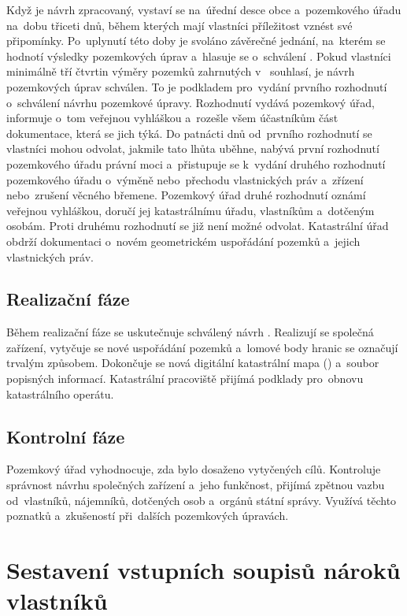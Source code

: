 Když je návrh zpracovaný, vystaví se na~úřední desce obce a~pozemkového úřadu na~dobu třiceti dnů, během kterých mají vlastníci příležitost vznést své připomínky. Po~uplynutí této doby je svoláno závěrečné jednání, na~kterém se hodnotí výsledky pozemkových úprav a~hlasuje se o~schválení . Pokud vlastníci minimálně tří čtvrtin výměry pozemků zahrnutých v~ souhlasí, je návrh pozemkových úprav schválen. To je podkladem pro~vydání prvního rozhodnutí o~schválení návrhu pozemkové úpravy. Rozhodnutí vydává pozemkový úřad, informuje o~tom veřejnou vyhláškou a~rozešle všem účastníkům část dokumentace, která se jich týká. Do patnácti dnů od~prvního rozhodnutí se vlastníci mohou odvolat, jakmile tato lhůta uběhne, nabývá první rozhodnutí pozemkového úřadu právní moci a~přistupuje se k~vydání druhého rozhodnutí pozemkového úřadu o~výměně nebo~přechodu vlastnických práv a~zřízení nebo~zrušení věcného břemene. Pozemkový úřad druhé rozhodnutí oznámí veřejnou vyhláškou, doručí jej katastrálnímu úřadu, vlastníkům a~dotčeným osobám. Proti druhému rozhodnutí se již není možné odvolat. Katastrální úřad obdrží dokumentaci o~novém geometrickém uspořádání pozemků a~jejich vlastnických práv.

\subsection{Realizační fáze}
\label{realizacni_faze}

Během realizační fáze se uskutečnuje schválený návrh . Realizují se společná zařízení, vytyčuje se nové uspořádání pozemků a~lomové body hranic se označují trvalým způsobem. Dokončuje se nová digitální katastrální mapa () a~soubor popisných informací. Katastrální pracoviště přijímá podklady pro~obnovu katastrálního operátu.

\subsection{Kontrolní fáze}
\label{kontrolni_faze}

Pozemkový úřad vyhodnocuje, zda bylo dosaženo vytyčených cílů. Kontroluje správ\-nost návrhu společných zařízení a~jeho funkčnost, přijímá zpětnou vazbu od~vlastníků, nájemníků, dotčených osob a~orgánů státní správy. Využívá těchto poznatků a~zkušeností při~dalších pozemkových úpravách.

\section{Sestavení vstupních soupisů nároků vlastníků}
\label{naroky}


